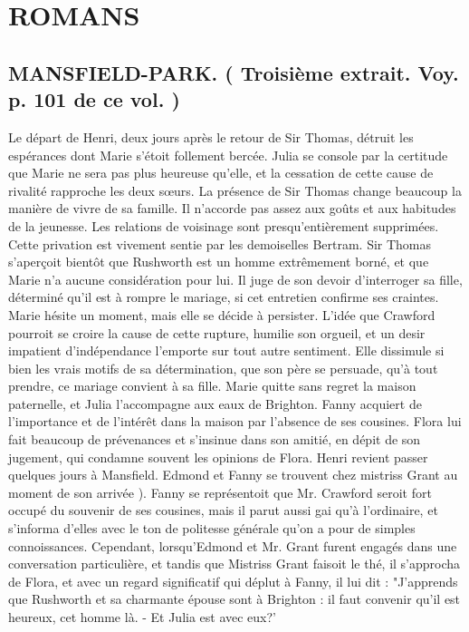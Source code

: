 \setcounter{page}{243}
\chapter{ROMANS}
\section{MANSFIELD-PARK. \large{( Troisième extrait. Voy. p. 101 de ce vol. )}}
Le départ de Henri, deux jours après le retour de Sir Thomas, détruit les espérances dont Marie s'étoit follement bercée. Julia se console par la certitude que Marie ne sera pas plus heureuse qu'elle, et la cessation de cette cause de rivalité rapproche les deux sœurs. La présence de Sir Thomas change beaucoup la manière de vivre de sa famille. Il n'accorde pas assez aux goûts et aux habitudes de la jeunesse. Les relations de voisinage sont presqu'entièrement supprimées. Cette privation est vivement sentie par les demoiselles Bertram. Sir Thomas s'aperçoit bientôt que Rushworth est un homme extrêmement borné, et que Marie n'a aucune considération pour lui. Il juge de son devoir d'interroger sa fille, déterminé qu'il est à rompre le mariage, si cet entretien confirme ses craintes. Marie hésite un moment, mais elle se décide à persister.\setcounter{page}{244} L'idée que Crawford pourroit se croire la cause de cette rupture, humilie son orgueil, et un desir impatient d'indépendance l'emporte sur tout autre sentiment. Elle dissimule si bien les vrais motifs de sa détermination, que son père se persuade, qu'à tout prendre, ce mariage convient à sa fille.
Marie quitte sans regret la maison paternelle, et Julia l'accompagne aux eaux de Brighton.
Fanny acquiert de l'importance et de l'intérêt dans la maison par l'absence de ses cousines. Flora lui fait beaucoup de prévenances et s'insinue dans son amitié, en dépit de son jugement, qui condamne souvent les opinions de Flora. Henri revient passer quelques jours à Mansfield. Edmond et Fanny se trouvent chez mistriss Grant au moment de son arrivée ).
Fanny se représentoit que Mr. Crawford seroit fort occupé du souvenir de ses cousines, mais il parut aussi gai qu'à l'ordinaire, et s'informa d'elles avec le ton de politesse générale qu'on a pour de simples connoissances. Cependant, lorsqu'Edmond et Mr. Grant furent engagés dans une conversation particulière, et tandis que Mistriss Grant faisoit le thé, il s'approcha de Flora, et avec un regard significatif qui déplut à Fanny,\setcounter{page}{245} il lui dit : "J'apprends que Rushworth et sa charmante épouse sont à Brighton : il faut convenir qu'il est heureux, cet homme là. - Et Julia est avec eux?'
